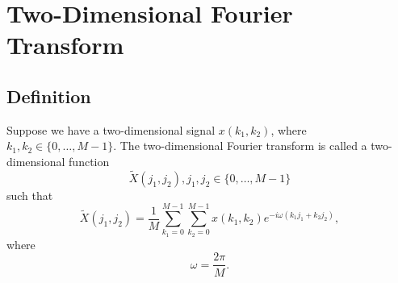 \section{Two-Dimensional Fourier Transform}
\subsection{Definition}

\begin{definition}
Suppose we have a two-dimensional signal $x\left(k_1, k_2\right)$, where 
$k_1,k_2 \in \{0, \dots, M - 1\}$. The two-dimensional Fourier transform
is called a two-dimensional function 
\[
\tilde{X}\left(j_1, j_2\right), j_1,j_2
\in \{0, \dots, M - 1\}
\]
such that
\[
\tilde{X}\left(j_1, j_2\right) = 
\frac{1}{M}\sum_{k_1 = 0}^{M-1}\sum_{k_2 = 0}^{M-1}
x\left(k_1, k_2\right)e^{-i \omega\left(k_1 j_1 + k_2 j_2\right)},
\]
where
\[
\omega = \frac{2 \pi}{M}.
\]
\label{def:add:dsp:fourier2d}
\end{definition}